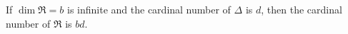 If $\dim \mathfrak{R} = b$ is infinite and the cardinal number of $\Delta$ is $d$, then the cardinal number of $\mathfrak{R}$ is $bd$.
